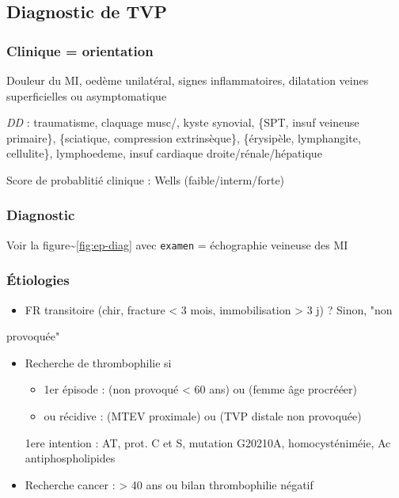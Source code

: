 \documentclass{book}
\begin{document}
\subsection{Diagnostic de TVP}
\label{sec:org0d815e6}
\subsubsection{Clinique = orientation}
\label{sec:orgbdb5a6d}
Douleur du MI, oedème unilatéral, signes inflammatoires, dilatation veines
superficielles ou asymptomatique

\emph{DD}  : traumatisme, claquage musc/, kyste synovial, \{SPT, insuf veineuse
primaire\}, \{sciatique, compression extrinsèque\}, \{érysipèle, lymphangite,
cellulite\}, lymphoedeme, insuf cardiaque droite/rénale/hépatique

Score de probablitié clinique : Wells (faible/interm/forte)

\subsubsection{Diagnostic}
\label{sec:orge456e85}
Voir la figure\textasciitilde{}\ref{fig:ep-diag} avec \texttt{examen} = échographie veineuse
des MI

\subsubsection{Étiologies}
\label{sec:org4342cc4}

\begin{itemize}
\item FR transitoire (chir, fracture < 3 mois, immobilisation > 3 j) ? Sinon, "non
\end{itemize}
provoquée"
\begin{itemize}
\item Recherche de thrombophilie si

\begin{itemize}
\item 1er épisode :  (non provoqué < 60 ans) ou (femme âge procrééer)
\item ou récidive : (MTEV proximale) ou (TVP distale non provoquée)
\end{itemize}

\thus 1ere intention : \gls{AT}, prot. C et S, mutation G20210A,
homocysténiméie, Ac antiphospholipides
\item Recherche cancer : > 40 ans ou bilan thrombophilie négatif
\end{itemize}
\end{document}
